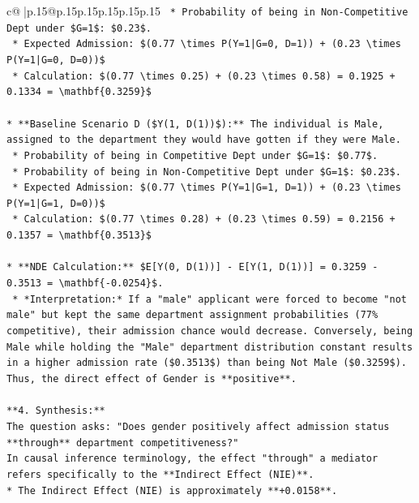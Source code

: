 \documentclass{article}
\begin{document}
{\begin{supertabular}{c@{$\;$}|p{.15\linewidth}@{}p{.15\linewidth}p{.15\linewidth}p{.15\linewidth}p{.15\linewidth}p{.15\linewidth}}
{{{\texttt{    *   Probability of being in Non{-}Competitive Dept under \$G=1\$: \$0.23\$.} \\
\texttt{    *   Expected Admission: \$(0.77 \textbackslash{}times P(Y=1|G=0, D=1)) + (0.23 \textbackslash{}times P(Y=1|G=0, D=0))\$} \\
\texttt{    *   Calculation: \$(0.77 \textbackslash{}times 0.25) + (0.23 \textbackslash{}times 0.58) = 0.1925 + 0.1334 = \textbackslash{}mathbf\{0.3259\}\$} \\
\\ 
\texttt{*   **Baseline Scenario D (\$Y(1, D(1))\$):** The individual is Male, assigned to the department they would have gotten if they were Male.} \\
\texttt{    *   Probability of being in Competitive Dept under \$G=1\$: \$0.77\$.} \\
\texttt{    *   Probability of being in Non{-}Competitive Dept under \$G=1\$: \$0.23\$.} \\
\texttt{    *   Expected Admission: \$(0.77 \textbackslash{}times P(Y=1|G=1, D=1)) + (0.23 \textbackslash{}times P(Y=1|G=1, D=0))\$} \\
\texttt{    *   Calculation: \$(0.77 \textbackslash{}times 0.28) + (0.23 \textbackslash{}times 0.59) = 0.2156 + 0.1357 = \textbackslash{}mathbf\{0.3513\}\$} \\
\\ 
\texttt{*   **NDE Calculation:** \$E{[}Y(0, D(1)){]} {-} E{[}Y(1, D(1)){]} = 0.3259 {-} 0.3513 = \textbackslash{}mathbf\{{-}0.0254\}\$.} \\
\texttt{    *   *Interpretation:* If a "male" applicant were forced to become "not male" but kept the same department assignment probabilities (77\% competitive), their admission chance would decrease. Conversely, being Male while holding the "Male" department distribution constant results in a higher admission rate (\$0.3513\$) than being Not Male (\$0.3259\$). Thus, the direct effect of Gender is **positive**.} \\
\\ 
\texttt{**4. Synthesis:**} \\
\texttt{The question asks: "Does gender positively affect admission status **through** department competitiveness?"} \\
\texttt{In causal inference terminology, the effect "through" a mediator refers specifically to the **Indirect Effect (NIE)**.} \\
\texttt{*   The Indirect Effect (NIE) is approximately **+0.0158**.} \\
}}}
\end{supertabular}}
\end{document}
